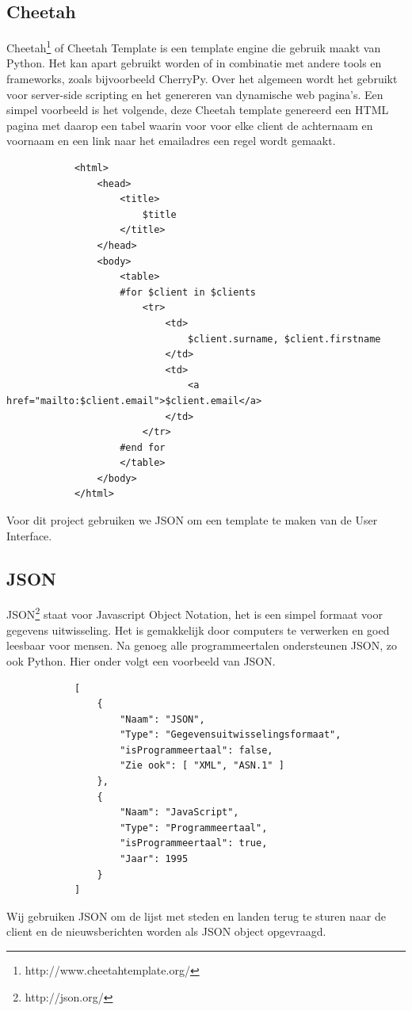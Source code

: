 \documentclass[twoside,openright]{uva-bachelor-thesis}
\begin{document}
		\subsection{Cheetah}
			Cheetah\footnote{http://www.cheetahtemplate.org/} of Cheetah Template is een template engine die gebruik maakt van Python. Het kan apart gebruikt worden of in combinatie met andere tools en frameworks, zoals bijvoorbeeld CherryPy. Over het algemeen wordt het gebruikt voor server-side scripting en het genereren van dynamische web pagina's. Een simpel voorbeeld is het volgende, deze Cheetah template genereerd een HTML pagina met daarop een tabel waarin voor voor elke client de achternaam en voornaam en een link naar het emailadres een regel wordt gemaakt.
			\begin{verbatim}
			<html>
			    <head>
			        <title>
			            $title
			        </title>
			    </head>
			    <body>
			        <table>
			        #for $client in $clients
			            <tr>
			                <td>
			                    $client.surname, $client.firstname
			                </td>
			                <td>
			                    <a href="mailto:$client.email">$client.email</a>
			                </td>
			            </tr>
			        #end for
			        </table>
			    </body>
			</html>
			\end{verbatim}
			Voor dit project gebruiken we JSON om een template te maken van de User Interface.
		\subsection{JSON}
			JSON\footnote{http://json.org/} staat voor Javascript Object Notation, het is een simpel formaat voor gegevens uitwisseling. Het is gemakkelijk door computers te verwerken en goed leesbaar voor mensen. Na genoeg alle programmeertalen ondersteunen JSON, zo ook Python. Hier onder volgt een voorbeeld van JSON.
			\begin{verbatim}
			[
			    { 
			        "Naam": "JSON",
			        "Type": "Gegevensuitwisselingsformaat",
			        "isProgrammeertaal": false,
			        "Zie ook": [ "XML", "ASN.1" ] 
			    },
			    { 
			        "Naam": "JavaScript",
			        "Type": "Programmeertaal",
			        "isProgrammeertaal": true,
			        "Jaar": 1995 
			    } 
			]
			\end{verbatim}
			Wij gebruiken JSON om de lijst met steden en landen terug te sturen naar de client en de nieuwsberichten worden als JSON object opgevraagd. 
\end{document}
